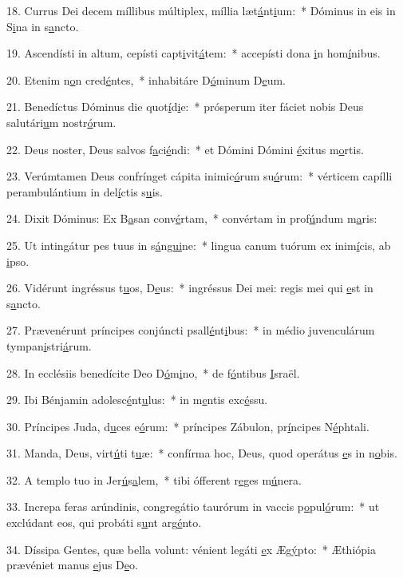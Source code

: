 18. Currus Dei decem míllibus múltiplex, míllia læt\uline{á}nt\uline{i}um:~* Dóminus in eis in S\uline{i}na in s\uline{a}ncto.\par 
19. Ascendísti in altum, cepísti capt\uline{i}vit\uline{á}tem:~* accepísti dona \uline{i}n hom\uline{í}nibus.\par 
20. Etenim n\uline{o}n cred\uline{é}ntes,~* inhabitáre D\uline{ó}minum D\uline{e}um.\par 
21. Benedíctus Dóminus die quot\uline{í}d\uline{i}e:~* prósperum iter fáciet nobis Deus salutári\uline{u}m nostr\uline{ó}rum.\par 
22. Deus noster, Deus salvos f\uline{a}ci\uline{é}ndi:~* et Dómini Dómini \uline{é}xitus m\uline{o}rtis.\par 
23. Verúmtamen Deus confrínget cápita inimic\uline{ó}rum su\uline{ó}rum:~* vérticem capílli perambulántium in del\uline{í}ctis s\uline{u}is.\par 
24. Dixit Dóminus: Ex B\uline{a}san conv\uline{é}rtam,~* convértam in prof\uline{ú}ndum m\uline{a}ris:\par 
25. Ut intingátur pes tuus in s\uline{á}n\uline{gui}ne:~* lingua canum tuórum ex inim\uline{í}cis, ab \uline{i}pso.\par 
26. Vidérunt ingréssus t\uline{u}os, D\uline{e}us:~* ingréssus Dei mei: regis mei qui \uline{e}st in s\uline{a}ncto.\par 
27. Prævenérunt príncipes conjúncti psall\uline{é}nt\uline{i}bus:~* in médio juvenculárum tympan\uline{i}stri\uline{á}rum.\par 
28. In ecclésiis benedícite Deo D\uline{ó}m\uline{i}no,~* de f\uline{ó}ntibus \uline{I}sraël.\par 
29. Ibi Bénjamin adolesc\uline{é}nt\uline{u}lus:~* in m\uline{e}ntis exc\uline{é}ssu.\par 
30. Príncipes Juda, d\uline{u}ces e\uline{ó}rum:~* príncipes Zábulon, pr\uline{í}ncipes N\uline{é}phtali.\par 
31. Manda, Deus, virt\uline{ú}ti t\uline{u}æ:~* confírma hoc, Deus, quod operátus \uline{e}s in n\uline{o}bis.\par 
32. A templo tuo in Jer\uline{ú}s\uline{a}lem,~* tibi ófferent r\uline{e}ges m\uline{ú}nera.\par 
33. Increpa feras arúndinis, congregátio taurórum in vaccis p\uline{o}pul\uline{ó}rum:~* ut exclúdant eos, qui probáti s\uline{u}nt arg\uline{é}nto.\par 
34. Díssipa Gentes, quæ bella volunt: vénient legáti \uline{e}x Æg\uline{ý}pto:~* Æthiópia prævéniet manus \uline{e}jus D\uline{e}o.\par 
